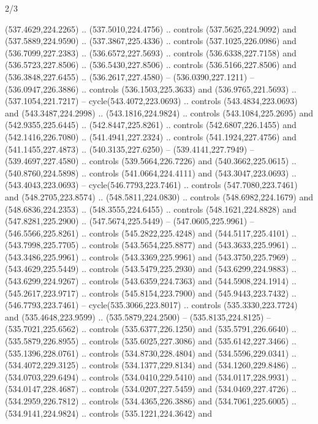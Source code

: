 \begin{flagdescription}{2/3}
\begin{scope}[xshift=0.5\flaglength,yshift=0.5\flagwidth,scale=\flagwidth/495.65]
\begin{scope}[y=0.8pt, x=0.8pt, yscale=-1,shift={(-463.76,-309.78)}]
  (537.4629,224.2265) .. (537.5010,224.4756) .. controls (537.5625,224.9092) and
  (537.5889,224.9590) .. (537.3867,225.4336) .. controls (537.1025,226.0986) and
  (536.7099,227.2383) .. (536.6572,227.5693) .. controls (536.6338,227.7158) and
  (536.5723,227.8506) .. (536.5430,227.8506) .. controls (536.5166,227.8506) and
  (536.3848,227.6455) .. (536.2617,227.4580) -- (536.0390,227.1211) --
  (536.0947,226.3886) .. controls (536.1503,225.3633) and (536.9765,221.5693) ..
  (537.1054,221.7217) -- cycle(543.4072,223.0693) .. controls
  (543.4834,223.0693) and (543.3487,224.2998) .. (543.1816,224.9824) .. controls
  (543.1084,225.2695) and (542.9355,225.6445) .. (542.8447,225.8261) .. controls
  (542.6807,226.1455) and (542.1416,226.7080) .. (541.4941,227.2324) .. controls
  (541.1924,227.4756) and (541.1455,227.4873) .. (540.3135,227.6250) --
  (539.4141,227.7949) -- (539.4697,227.4580) .. controls (539.5664,226.7226) and
  (540.3662,225.0615) .. (540.8760,224.5898) .. controls (541.0664,224.4111) and
  (543.3047,223.0693) .. (543.4043,223.0693) -- cycle(546.7793,223.7461) ..
  controls (547.7080,223.7461) and (548.2705,223.8574) .. (548.5811,224.0830) ..
  controls (548.6982,224.1679) and (548.6836,224.2353) .. (548.3555,224.6455) ..
  controls (548.1621,224.8828) and (547.8281,225.2900) .. (547.5674,225.5449) --
  (547.0605,225.9961) -- (546.5566,225.8261) .. controls (545.2822,225.4248) and
  (544.5117,225.4101) .. (543.7998,225.7705) .. controls (543.5654,225.8877) and
  (543.3633,225.9961) .. (543.3486,225.9961) .. controls (543.3369,225.9961) and
  (543.3750,225.7969) .. (543.4629,225.5449) .. controls (543.5479,225.2930) and
  (543.6299,224.9883) .. (543.6299,224.9267) .. controls (543.6359,224.7363) and
  (544.5908,224.1914) .. (545.2617,223.9717) .. controls (545.8154,223.7900) and
  (545.9443,223.7432) .. (546.7793,223.7461) -- cycle(535.3066,223.8017) ..
  controls (535.3330,223.7724) and (535.4648,223.9599) .. (535.5879,224.2500) --
  (535.8135,224.8125) -- (535.7021,225.6562) .. controls (535.6377,226.1250) and
  (535.5791,226.6640) .. (535.5879,226.8955) .. controls (535.6025,227.3086) and
  (535.6142,227.3466) .. (535.1396,228.0761) .. controls (534.8730,228.4804) and
  (534.5596,229.0341) .. (534.4072,229.3125) .. controls (534.1377,229.8134) and
  (534.1260,229.8486) .. (534.0703,229.6494) .. controls (534.0410,229.5410) and
  (534.0117,228.9931) .. (534.0147,228.4687) .. controls (534.0207,227.5459) and
  (534.0469,227.4726) .. (534.2959,226.7812) .. controls (534.4365,226.3886) and
  (534.7061,225.6005) .. (534.9141,224.9824) .. controls (535.1221,224.3642) and

\end{scope}
\end{scope}
\end{flagdescription}
